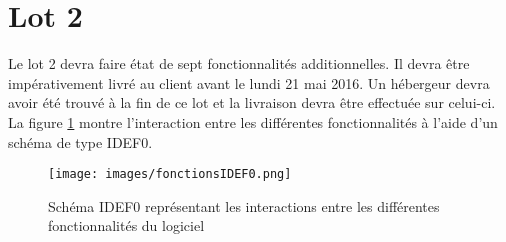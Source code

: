 \section{Lot 2}
	Le lot 2 devra faire état de sept fonctionnalités additionnelles. Il devra être impérativement livré au client avant le lundi 21 mai 2016. Un hébergeur devra avoir été trouvé à la fin de ce lot et la livraison devra être effectuée sur celui-ci.\\
	
	La figure \ref{IDEF0} montre l’interaction entre les différentes fonctionnalités à l'aide d'un schéma de type IDEF0.

\begin{figure}[!h]
	\begin{center}
	\texttt{[image: images/fonctionsIDEF0.png]}
	\caption{\label{IDEF0} Schéma IDEF0 représentant les interactions entre les différentes fonctionnalités du logiciel}
	\end{center}
\end{figure}
















 



